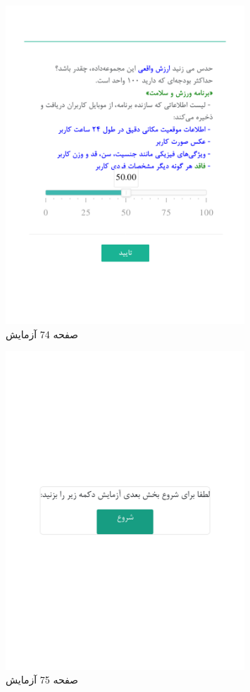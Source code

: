 { 
\begin{figure}[htpb]
\centering
\includegraphics[width=0.8\textwidth]{./img/Task74.png/}
\caption{ صفحه 74 آزمایش }
\label{fig:Task74}
\end{figure}
 
 
\begin{figure}[htpb]
\centering
\includegraphics[width=0.8\textwidth]{./img/Task75.png/}
\caption{ صفحه 75 آزمایش }
\label{fig:Task75}
\end{figure}
 
}
